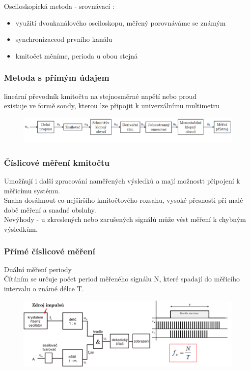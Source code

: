Osciloskopická metoda - srovnávací : \\
\begin{itemize}
    \item využití dvoukanálového osciloskopu, měřený porovnáváme se známým
    \item synchronizaceod prvního kanálu 
    \item kmitočet měníme, perioda u obou stejná 
\end{itemize}

\subsubsection*{Metoda s přímým údajem}
lineární převodník kmitočtu na stejnosměrné napětí nebo proud\\
existuje ve  formě sondy, kterou lze připojit k univerzálnímu multimetru\\
\begin{figure}[H]
    \includegraphics*[scale = 1.2]{images/primyUdaj.png}
\end{figure}

\subsubsection*{Číslicové měření kmitočtu}

Umožňují i další zpracování naměřených výsledků a mají možnostt připojení k měřicímu systému.\\
Snaha dosáhnout co nejširšího kmitočtového rozsahu, vysoké přesnosti při malé době měření a snadné obsluhy.\\
Nevýhody - u zkreslených nebo zarušených signálů může vést měření k chybným výsledkům.\\

\subsubsection*{Přímé číslicové měření}

Duální měření periody\\
Čítáním se určuje počet period měřeného signálu N, které spadají do měřicího intervalu o známé délce T.\\
\begin{figure}[H]
    \includegraphics*[scale = 1.2]{images/PrimeCislicoveMereni.png}
\end{figure}

